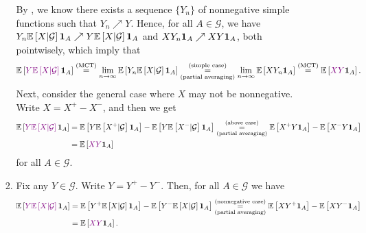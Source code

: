 \begin{enumerate}
\begin{pf}
\begin{enumerate}[label={(\arabic*)}]
\begin{enumerate}
By , we know there exists a sequence \(\{Y_n\}\) of
nonnegative simple functions such that \(Y_n\nearrow Y\). Hence, for all
\(A\in\mathcal{G}\), we have \(Y_n\mathbb{E}\left[X|\mathcal{G}\right]\mathbf{1}_{A}\nearrow
Y\mathbb{E}\left[X|\mathcal{G}\right]\mathbf{1}_{A}\) and \(XY_n\mathbf{1}_{A}\nearrow XY\mathbf{1}_{A}\),
both pointwisely, which imply that
\[
\expv{\vc{Y\expv{X|\mathcal{G}}}\indic_{A}}
\overset{\text{(MCT)}}{=}\lim_{n\to\infty}\expv{Y_n\expv{X|\mathcal{G}}\indic_{A}}
\underset{\text{(partial averaging)}}{\overset{\text{(simple case)}}{=}}
\lim_{n\to\infty}\expv{XY_n\indic_{A}}
\overset{\text{(MCT)}}{=}
\expv{\vc{XY}\indic_{A}}.
\]
Next, consider the general case where \(X\) may not be nonnegative. Write
\(X=X^{+}-X^{-}\), and then we get
\begin{align*}
\expv{\vc{Y\expv{X|\mathcal{G}}}\indic_{A}}
&=\expv{Y\expv{X^{+}|\mathcal{G}}\indic_{A}}-\expv{Y\expv{X^{-}|\mathcal{G}}\indic_{A}}
\underset{\text{(partial averaging)}}{\overset{\text{(above case)}}{=}}
\expv{X^{+}Y\indic_{A}}-\expv{X^{-}Y\indic_{A}} \\
&=\expv{\vc{XY}\indic_{A}}
\end{align*}
for all \(A\in\mathcal{G}\).
\item Fix any \(Y\in\mathcal{G}\). Write \(Y=Y^{+}-Y^{-}\).
Then, for all \(A\in\mathcal{G}\) we have
\begin{align*}
\expv{\vc{Y\expv{X|\mathcal{G}}}\indic_{A}}
&=\expv{Y^{+}\expv{X|\mathcal{G}}\indic_{A}}
-\expv{Y^{-}\expv{X|\mathcal{G}}\indic_{A}}
\underset{\text{(partial averaging)}}{\overset{\text{(nonnegative case)}}{=}}
\expv{XY^{+}\indic_{A}}
-\expv{XY^{-}\indic_{A}} \\
&=\expv{\vc{XY}\indic_{A}}.
\end{align*}
\end{enumerate}
\end{enumerate}
\end{pf}


\end{enumerate}
